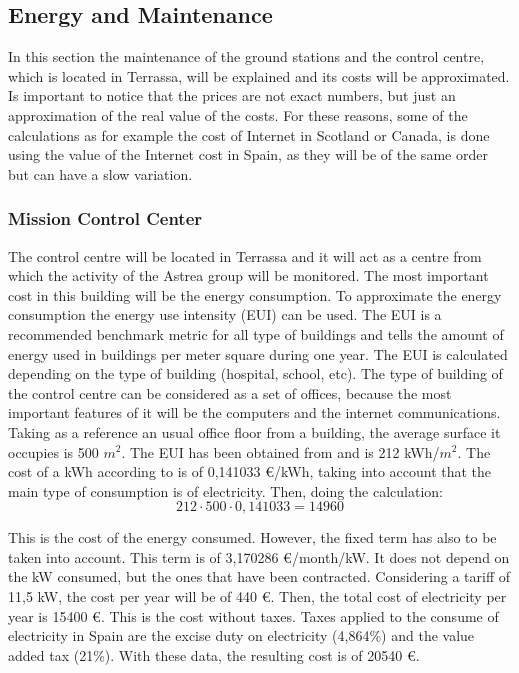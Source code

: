 \subsection{Energy and Maintenance}
In this section the maintenance of the ground stations and the control centre, which is located in Terrassa, will be explained and its costs will be approximated. Is important to notice that the prices are not exact numbers, but just an approximation of the real value of the costs. For these reasons, some of the calculations as for example the cost of Internet in Scotland or Canada, is done using the value of the Internet cost in Spain, as they will be of the same order but can have a slow variation.

\subsubsection{Mission Control Center}
The control centre will be located in Terrassa and it will act as a centre from which the activity of the Astrea group will be monitored. The most important cost in this building will be the energy consumption. To approximate the energy consumption the energy use intensity (EUI) can be used. The EUI is a recommended benchmark metric for all type of buildings and tells the amount of energy used in buildings per meter square during one year. The EUI is calculated depending on the type of building (hospital, school, etc). The type of building of the control centre can be considered as a set of offices, because the most important features of it will be the computers and the internet communications. Taking as a reference an usual office floor from a building, the average surface it occupies is 500 $m^2$. The EUI has been obtained from \cite{EUI} and is 212 kWh/$m^2$. The cost of a kWh according to \cite{endesa} is of 0,141033 \euro /kWh, taking into account that the main type of consumption is of electricity. Then, doing the calculation:
\begin{equation}
212 \cdot 500 \cdot 0,141033 = 14960
\end{equation}

This is the cost of the energy consumed. However, the fixed term has also to be taken into account. This term is of 3,170286 \euro /month/kW. It does not depend on the kW consumed, but the ones that have been contracted. Considering a tariff of 11,5 kW, the cost per year will be of 440 \euro. Then, the total cost of electricity per year is 15400 \euro. This is the cost without taxes. Taxes applied to the consume of electricity in Spain are the excise duty on electricity (4,864\%) and the value added tax (21\%). With these data, the resulting cost is of 20540 \euro.

